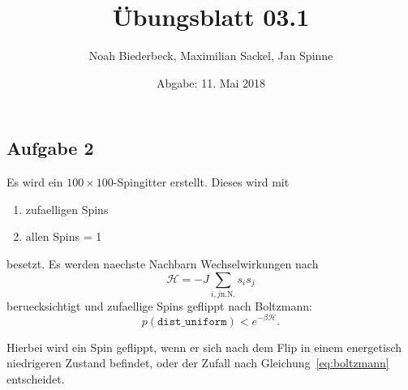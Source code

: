 \documentclass{scrartcl}
\title{Übungsblatt 03.1}
\author{%
  Noah Biederbeck, Maximilian Sackel, Jan Spinne
}
\date{Abgabe: 11. Mai 2018}
\begin{document}
\maketitle

\subsection*{Aufgabe 2}%
\label{sec:aufgabe_2}
Es wird ein $100 \times 100$-Spingitter erstellt.
Dieses wird mit
\begin{enumerate}
  \item zufaelligen Spins
  \item allen Spins = 1
\end{enumerate}
besetzt.
Es werden naechste Nachbarn Wechselwirkungen nach
\begin{equation}
  \mathcal{H} = -J \sum_{i, j \text{n.N.}} s_i s_j
\end{equation}
beruecksichtigt und zufaellige Spins geflippt nach Boltzmann:
\begin{equation}
  p(\texttt{dist\_uniform}) < e^{-\beta \mathcal{H}}.
  \label{eq:boltzmann}
\end{equation}

Hierbei wird ein Spin geflippt, wenn er sich nach dem Flip in einem energetisch niedrigeren Zustand befindet, oder der Zufall nach Gleichung~\ref{eq:boltzmann} entscheidet.
\end{document}
